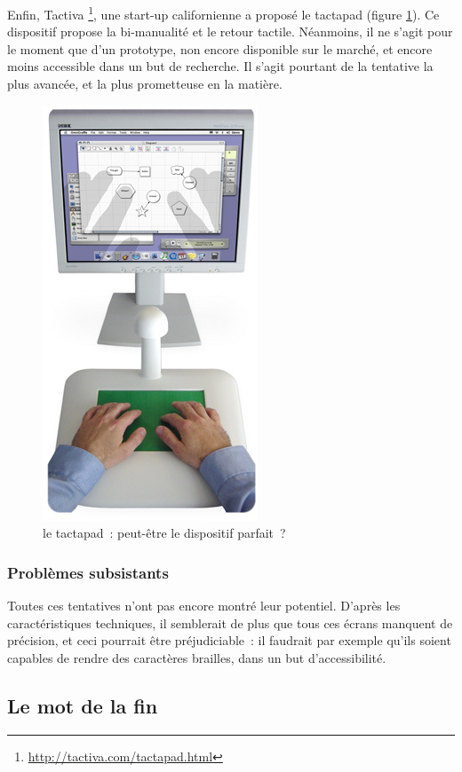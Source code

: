 \documentclass[
]{book}
\begin{document}
Enfin, Tactiva \footnote{\url{http://tactiva.com/tactapad.html}}, une start-up californienne a
proposé le tactapad (figure \ref{fig:tactiva}). Ce dispositif
propose la bi-manualité et le retour tactile. Néanmoins, il ne s'agit pour le
moment que d'un prototype, non encore disponible sur le marché, et encore
moins accessible dans un but de recherche. Il s'agit pourtant de la tentative
la plus avancée, et la plus prometteuse en la matière.

\begin{figure}
\centering
\includegraphics{img/tactapad2.jpg}
\caption{\label{fig:tactiva}le tactapad~: peut-être le dispositif
parfait~?}
\end{figure}

\hypertarget{probluxe8mes-subsistants}{%
\subsubsection{Problèmes subsistants}\label{probluxe8mes-subsistants}}

Toutes ces tentatives n'ont pas encore montré leur potentiel. D'après les
caractéristiques techniques, il semblerait de plus que tous ces écrans
manquent de précision, et ceci pourrait être préjudiciable~: il faudrait par
exemple qu'ils soient capables de rendre des caractères brailles, dans un but
d'accessibilité.

\hypertarget{le-mot-de-la-fin}{%
\subsection{Le mot de la fin}\label{le-mot-de-la-fin}}
\end{document}
